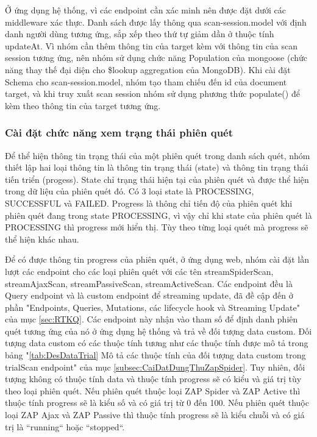 Ở ứng dụng hệ thống, vì các endpoint cần xác minh nên được đặt dưới các middleware xác thực. Danh sách được lấy thông qua scan-session.model với định danh người dùng tương ứng, sắp xếp theo thứ tự giảm dần ở thuộc tính updateAt. Vì nhóm cần thêm thông tin của target kèm với thông tin của scan session tương ứng, nên nhóm sử dụng chức năng Population của mongoose (chức năng thay thế đại diện cho \$lookup aggregation của MongoDB). Khi cài đặt Schema cho scan-session.model, nhóm tạo tham chiếu đến id của document target, và khi truy xuất scan session nhóm sử dụng phương thức populate() để kèm theo thông tin của target tương ứng.

\subsubsection{Cài đặt chức năng xem trạng thái phiên quét}

\tab Để thể hiện thông tin trạng thái của một phiên quét trong danh sách quét, nhóm thiết lập hai loại thông tin là thông tin trạng thái (state) và thông tin trạng thái tiến triển (progess). State chỉ trạng thái hiện tại của phiên quét và được thể hiện trong dữ liệu của phiên quét đó. Có 3 loại state là PROCESSING, SUCCESSFUL và FAILED. Progress là thông chỉ tiến độ của phiên quét khi phiên quét đang trong state PROCESSING, vì vậy chỉ khi state của phiên quét là PROCESSING thì progress mới hiển thị. Tùy theo từng loại quét mà progress sẽ thể hiện khác nhau.

Để có được thông tin progress của phiên quét, ở ứng dụng web, nhóm cài đặt lần lượt các endpoint cho các loại phiên quét với các tên streamSpiderScan, streamAjaxScan, streamPassiveScan, streamActiveScan.
Các endpoint đều là Query endpoint và là custom endpoint để streaming update, đã đề cập đến ở phần "Endpoints, Queries, Mutations, các lifecycle hook và Streaming Update" của mục \ref{sec:RTKQ}.
Các endpoint này nhận vào tham số để định danh phiên quét tương ứng của nó ở ứng dụng hệ thống và trả về đối tượng data custom.
Đối tượng data custom có các thuộc tính tương như các thuộc tính được mô tả trong bảng "\ref{tab:DesDataTrial} Mô tả các thuộc tính của đối tượng data custom trong trialScan endpoint" của mục \ref{subsec:CaiDatDungThuZapSpider}.
Tuy nhiên, đối tượng không có thuộc tính data và thuộc tính progress sẽ có kiểu và giá trị tùy theo loại phiên quét. Nếu phiên quét thuộc loại ZAP Spider và ZAP Active thì thuộc tính progress sẽ là kiểu số và có giá trị từ 0 đến 100. Nếu phiên quét thuộc loại ZAP Ajax và ZAP Passive thì thuộc tính progress sẽ là kiểu chuỗi và có giá trị là “running“ hoặc “stopped“.


